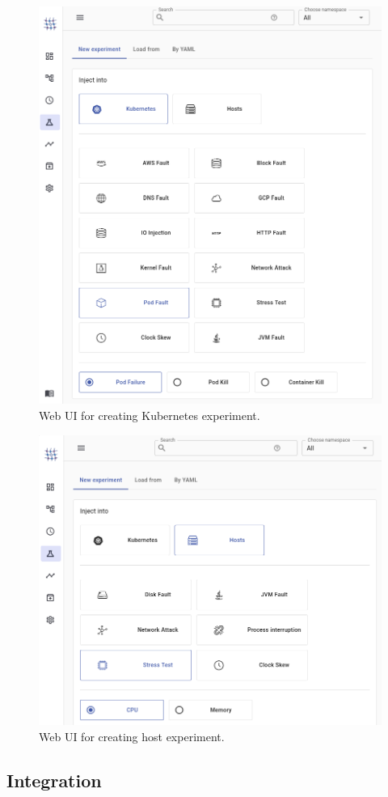 \documentclass[conference]{IEEEtran}
\begin{document}
\begin{figure}
	\centering
	\includegraphics[width=0.8\linewidth]{chaos_mesh_new_experiment_kubernetes}
	\caption{Web UI for creating Kubernetes experiment.}
	\label{fig:chaosmeshnewexperimentkubernetes}
\end{figure}

\begin{figure}
	\centering
	\includegraphics[width=0.7\linewidth]{chaos_mesh_new_experiment_hosts}
	\caption{Web UI for creating host experiment.}
	\label{fig:chaosmeshnewexperimenthosts}
\end{figure}

\subsection{Integration}
\end{document}
